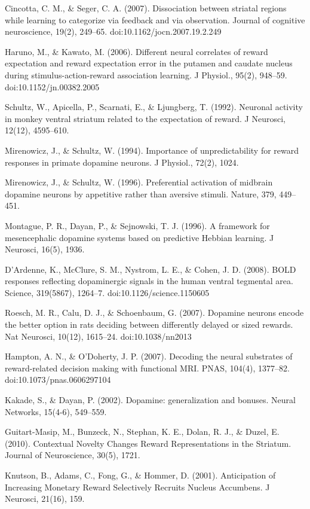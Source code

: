 Cincotta, C. M., & Seger, C. A. (2007). Dissociation between striatal regions while learning to categorize via feedback and via observation. Journal of cognitive neuroscience, 19(2), 249–65. doi:10.1162/jocn.2007.19.2.249

Haruno, M., & Kawato, M. (2006). Different neural correlates of reward expectation and reward expectation error in the putamen and caudate nucleus during stimulus-action-reward association learning. J Physiol., 95(2), 948–59. doi:10.1152/jn.00382.2005

Schultz, W., Apicella, P., Scarnati, E., & Ljungberg, T. (1992). Neuronal activity in monkey ventral striatum related to the expectation of reward. J Neurosci, 12(12), 4595–610.

Mirenowicz, J., & Schultz, W. (1994). Importance of unpredictability for reward responses in primate dopamine neurons. J Physiol., 72(2), 1024.

Mirenowicz, J., & Schultz, W. (1996). Preferential activation of midbrain dopamine neurons by appetitive rather than aversive stimuli. Nature, 379, 449–451.

Montague, P. R., Dayan, P., & Sejnowski, T. J. (1996). A framework for mesencephalic dopamine systems based on predictive Hebbian learning. J Neurosci, 16(5), 1936.

D'Ardenne, K., McClure, S. M., Nystrom, L. E., & Cohen, J. D. (2008). BOLD responses reflecting dopaminergic signals in the human ventral tegmental area. Science, 319(5867), 1264–7. doi:10.1126/science.1150605

Roesch, M. R., Calu, D. J., & Schoenbaum, G. (2007). Dopamine neurons encode the better option in rats deciding between differently delayed or sized rewards. Nat Neurosci, 10(12), 1615–24. doi:10.1038/nn2013

Hampton, A. N., & O'Doherty, J. P. (2007). Decoding the neural substrates of reward-related decision making with functional MRI. PNAS, 104(4), 1377–82. doi:10.1073/pnas.0606297104

Kakade, S., & Dayan, P. (2002). Dopamine: generalization and bonuses. Neural Networks, 15(4-6), 549–559.

Guitart-Masip, M., Bunzeck, N., Stephan, K. E., Dolan, R. J., & Duzel, E. (2010). Contextual Novelty Changes Reward Representations in the Striatum. Journal of Neuroscience, 30(5), 1721.

Knutson, B., Adams, C., Fong, G., & Hommer, D. (2001). Anticipation of Increasing Monetary Reward Selectively Recruits Nucleus Accumbens. J Neurosci, 21(16), 159.

